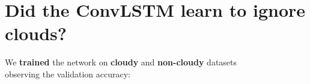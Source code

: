 \documentclass[a0]{tumposter}
\begin{document}
\vspace{.5em}

\section{Did the ConvLSTM learn to ignore clouds?}

%

\begin{minipage}{0.49\linewidth}
	We \textbf{trained} the network on \textbf{cloudy} and \textbf{non-cloudy} datasets \\
	observing the validation accuracy:
	
	\vspace{1em}
	
	
	
	
\end{minipage}
\hfill
\end{document}
